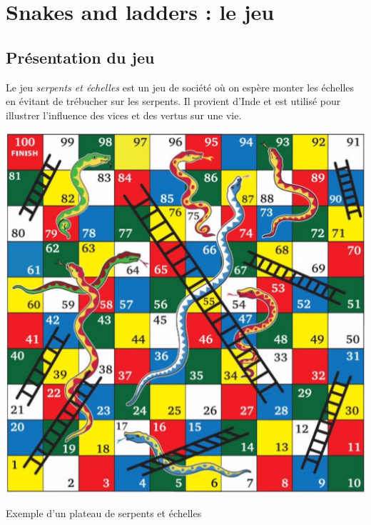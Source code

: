 
\section*{Snakes and ladders : le jeu}




\subsection*{Présentation du jeu}
Le jeu \emph{serpents et échelles} est un jeu de société où on espère monter les échelles en évitant de trébucher sur les serpents. Il provient d'Inde et est utilisé pour illustrer l'influence des vices et des vertus sur une vie.

\begin{marginfigure}%
		\includegraphics[width=\linewidth]{snakesAndLadders.png}
	\caption{Exemple d'un plateau de serpents et échelles}
	\label{fig:1}
\end{marginfigure}

